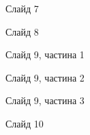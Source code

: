 \documentclass{thesis_utf8}
\begin{document}
\begin{figure}[!h]
    \centering
    \caption{Слайд 7}
    \label{fig:Slide7}
\end{figure}

\begin{figure}[!h]
    \centering
    \caption{Слайд 8}
    \label{fig:Slide8}
\end{figure}

\begin{figure}[!h]
    \centering
    \caption{Слайд 9, частина 1}
    \label{fig:Slide9_1}
\end{figure}

\begin{figure}[!h]
    \centering
    \caption{Слайд 9, частина 2}
    \label{fig:Slide9_2}
\end{figure}

\begin{figure}[!h]
    \centering
    \caption{Слайд 9, частина 3}
    \label{fig:Slide9_3}
\end{figure}

\begin{figure}[!h]
    \centering
    \caption{Слайд 10}
    \label{fig:Slide10}
\end{figure}
\end{document}
